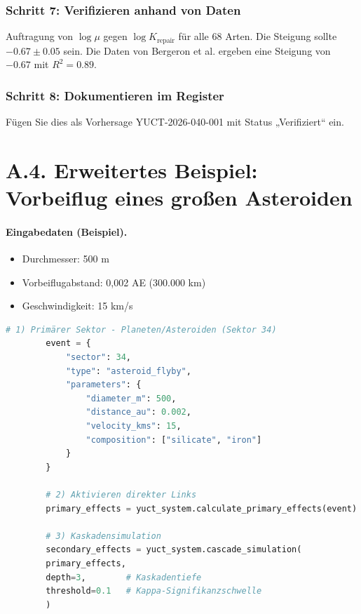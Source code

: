 \documentclass[13pt,a4paper]{article}
\begin{document}
	\subsubsection*{Schritt 7: Verifizieren anhand von Daten}
	Auftragung von \(\log \mu\) gegen \(\log K_{\mathrm{repair}}\) für alle 68 Arten. Die Steigung sollte \(-0.67 \pm 0.05\) sein. Die Daten von Bergeron et al. ergeben eine Steigung von \(-0.67\) mit \(R^2 = 0.89\).
	
	\subsubsection*{Schritt 8: Dokumentieren im Register}
	Fügen Sie dies als Vorhersage YUCT-2026-040-001 mit Status „Verifiziert“ ein.
	
	
	\section*{A.4. Erweitertes Beispiel: Vorbeiflug eines großen Asteroiden}
	
	\paragraph{Eingabedaten (Beispiel).}
	\begin{itemize}[leftmargin=*]
		\item Durchmesser: 500 m
		\item Vorbeiflugabstand: 0,002 AE (300.000 km)
		\item Geschwindigkeit: 15 km/s
	\end{itemize}
	
	\begin{lstlisting}[language=Python]
		# 1) Primärer Sektor - Planeten/Asteroiden (Sektor 34)
		event = {
			"sector": 34,
			"type": "asteroid_flyby",
			"parameters": {
				"diameter_m": 500,
				"distance_au": 0.002,
				"velocity_kms": 15,
				"composition": ["silicate", "iron"]
			}
		}
		
		# 2) Aktivieren direkter Links
		primary_effects = yuct_system.calculate_primary_effects(event)
		
		# 3) Kaskadensimulation
		secondary_effects = yuct_system.cascade_simulation(
		primary_effects,
		depth=3,        # Kaskadentiefe
		threshold=0.1   # Kappa-Signifikanzschwelle
		)
	\end{lstlisting}
	
\end{document}
